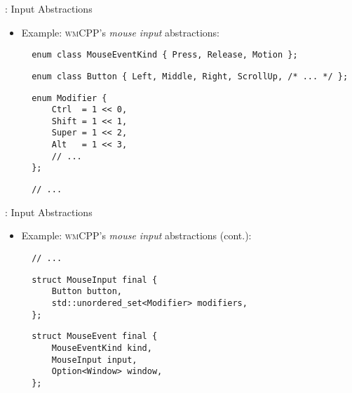 \begin{frame}[fragile]{\underline{\cpp}: Input Abstractions \hfill {\footnotesize \currentname}}


    \begin{itemize}

        \item Example: \textsc{wmCPP}'s \textit{mouse input} abstractions:\\[3pt]
\begin{verbatim}
  enum class MouseEventKind { Press, Release, Motion };
\end{verbatim}
\begin{verbatim}
  enum class Button { Left, Middle, Right, ScrollUp, /* ... */ };
\end{verbatim}
\begin{verbatim}
  enum Modifier {
      Ctrl  = 1 << 0,
      Shift = 1 << 1,
      Super = 1 << 2,
      Alt   = 1 << 3,
      // ...
  };
\end{verbatim}
\begin{verbatim}
  // ...
\end{verbatim}

    \end{itemize}

    \vfill

\end{frame}

\begin{frame}[fragile]{\underline{\cpp}: Input Abstractions \hfill {\footnotesize \currentname}}


    \begin{itemize}

        \item Example: \textsc{wmCPP}'s \textit{mouse input} abstractions (cont.):\\[3pt]
\begin{verbatim}
  // ...
\end{verbatim}
\begin{verbatim}
  struct MouseInput final {
      Button button,
      std::unordered_set<Modifier> modifiers,
  };
\end{verbatim}
\begin{verbatim}
  struct MouseEvent final {
      MouseEventKind kind,
      MouseInput input,
      Option<Window> window,
  };
\end{verbatim}

    \end{itemize}

    \vfill

\end{frame}

